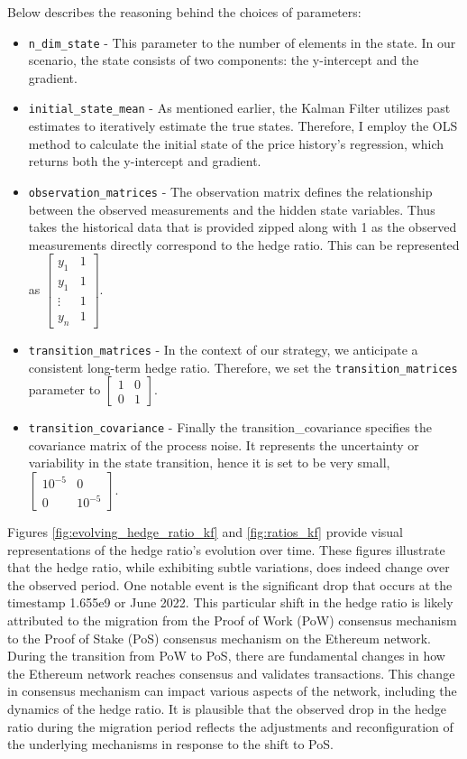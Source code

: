 \noindent Below describes the reasoning behind the choices of parameters:
\begin{itemize}
    \item \texttt{n\_dim\_state} - This parameter to the number of elements in the state. In our scenario, the state consists of two components: the y-intercept and the gradient.
    \item \texttt{initial\_state\_mean} - As mentioned earlier, the Kalman Filter utilizes past estimates to iteratively estimate the true states. Therefore, I employ the OLS method to calculate the initial state of the price history's regression, which returns both the y-intercept and gradient.
    \item \texttt{observation\_matrices} - The observation matrix defines the relationship between the observed measurements and the hidden state variables. Thus takes the historical data that is provided zipped along with 1 as the observed measurements directly correspond to the hedge ratio. This can be represented as $\begin{bmatrix} y_1 & 1 \\ y_1 & 1 \\ \vdots & 1 \\ y_n & 1\end{bmatrix}$.
    \item \texttt{transition\_matrices} - In the context of our strategy, we anticipate a consistent long-term hedge ratio. Therefore, we set the \texttt{transition\_matrices} parameter to $\begin{bmatrix} 1 & 0\\ 0 & 1 \end{bmatrix}$.
    \item \texttt{transition\_covariance} - Finally the transition\_covariance specifies the covariance matrix of the process noise. It represents the uncertainty or variability in the state transition, hence it is set to be very small, $\begin{bmatrix} 10^{-5} & 0\\ 0 & 10^{-5} \end{bmatrix}$.
\end{itemize}

Figures \ref{fig:evolving_hedge_ratio_kf} and \ref{fig:ratios_kf} provide visual representations of the hedge ratio's evolution over time. These figures illustrate that the hedge ratio, while exhibiting subtle variations, does indeed change over the observed period. One notable event is the significant drop that occurs at the timestamp 1.655e9 or June 2022. This particular shift in the hedge ratio is likely attributed to the migration from the Proof of Work (PoW) consensus mechanism to the Proof of Stake (PoS) consensus mechanism on the Ethereum network.
\\[3mm]
During the transition from PoW to PoS, there are fundamental changes in how the Ethereum network reaches consensus and validates transactions. This change in consensus mechanism can impact various aspects of the network, including the dynamics of the hedge ratio. It is plausible that the observed drop in the hedge ratio during the migration period reflects the adjustments and reconfiguration of the underlying mechanisms in response to the shift to PoS.

